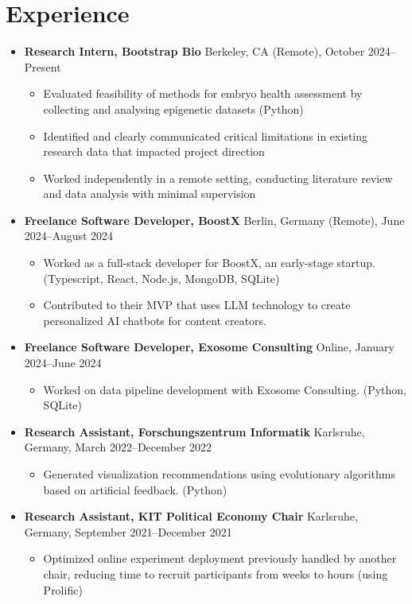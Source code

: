\documentclass[letterpaper, 9pt]{article}
\begin{document}
\section*{Experience}
\begin{itemize}
\item \textbf{Research Intern, Bootstrap Bio} \hfill Berkeley, CA (Remote), October 2024--Present
    \begin{itemize}
        \item Evaluated feasibility of methods for embryo health assessment by collecting and  analysing epigenetic datasets (Python)
      \item Identified and clearly communicated critical limitations in existing research data that impacted project direction
      \item Worked independently in a remote setting, conducting literature review and data analysis with minimal supervision

    \end{itemize}
\item \textbf{Freelance Software Developer, BoostX} \hfill Berlin, Germany (Remote), June 2024--August 2024
    \begin{itemize}
       \item Worked as a full-stack developer for BoostX, an early-stage startup. (Typescript, React, Node.js, MongoDB, SQLite)
       \item Contributed to their MVP that uses LLM technology to create personalized AI chatbots for content creators.
    \end{itemize}
    \item \textbf{Freelance Software Developer, Exosome Consulting} \hfill Online, January 2024--June 2024
    \begin{itemize}
       \item Worked on data pipeline development with Exosome Consulting. (Python, SQLite)
    \end{itemize}
    \item \textbf{Research Assistant, Forschungszentrum Informatik} \hfill Karlsruhe, Germany, March 2022--December 2022
    \begin{itemize}
        \item Generated visualization recommendations using evolutionary algorithms based on artificial feedback. (Python)
    \end{itemize}
    \item \textbf{Research Assistant, KIT Political Economy Chair} \hfill Karlsruhe, Germany, September 2021--December 2021
    \begin{itemize}
        \item Optimized online experiment deployment previously handled by another chair, reducing time to recruit participants from weeks to hours (using Prolific)
    \end{itemize}
\end{itemize}
\end{document}

